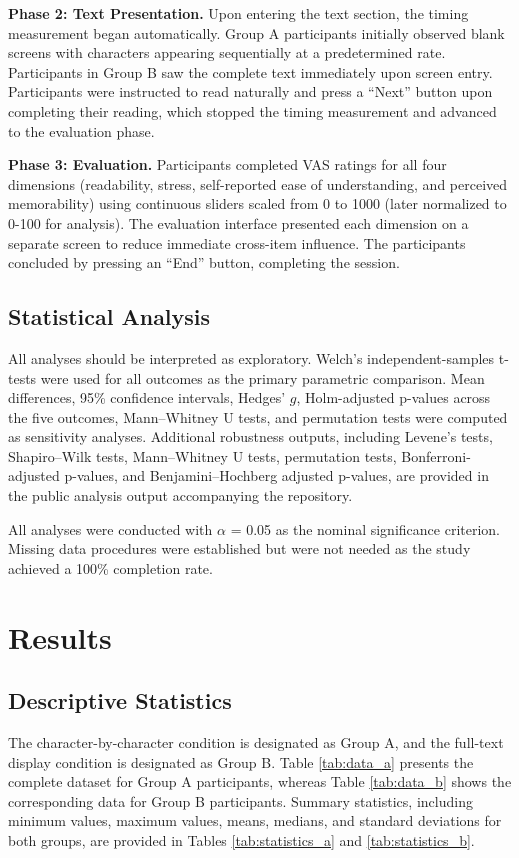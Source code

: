\documentclass[authoryear]{elsarticle}
\begin{document}
\textbf{Phase 2: Text Presentation.} Upon entering the text section, the timing measurement began automatically. Group A participants initially observed blank screens with characters appearing sequentially at a predetermined rate. Participants in Group B saw the complete text immediately upon screen entry. Participants were instructed to read naturally and press a ``Next'' button upon completing their reading, which stopped the timing measurement and advanced to the evaluation phase.

\textbf{Phase 3: Evaluation.} Participants completed VAS ratings for all four dimensions (readability, stress, self-reported ease of understanding, and perceived memorability) using continuous sliders scaled from 0 to 1000 (later normalized to 0-100 for analysis). The evaluation interface presented each dimension on a separate screen to reduce immediate cross-item influence. The participants concluded by pressing an ``End'' button, completing the session.

\subsection{Statistical Analysis}
All analyses should be interpreted as exploratory. Welch's independent-samples t-tests were used for all outcomes as the primary parametric comparison. Mean differences, 95\% confidence intervals, Hedges' $g$, Holm-adjusted p-values across the five outcomes, Mann--Whitney U tests, and permutation tests were computed as sensitivity analyses. Additional robustness outputs, including Levene's tests, Shapiro--Wilk tests, Mann--Whitney U tests, permutation tests, Bonferroni-adjusted p-values, and Benjamini--Hochberg adjusted p-values, are provided in the public analysis output accompanying the repository.

All analyses were conducted with $\alpha$ = 0.05 as the nominal significance criterion. Missing data procedures were established but were not needed as the study achieved a 100\% completion rate.

\section{Results}
\subsection{Descriptive Statistics}
The character-by-character condition is designated as Group A, and the full-text display condition is designated as Group B. Table \ref{tab:data_a} presents the complete dataset for Group A participants, whereas Table \ref{tab:data_b} shows the corresponding data for Group B participants. Summary statistics, including minimum values, maximum values, means, medians, and standard deviations for both groups, are provided in Tables \ref{tab:statistics_a} and \ref{tab:statistics_b}.
\end{document}
